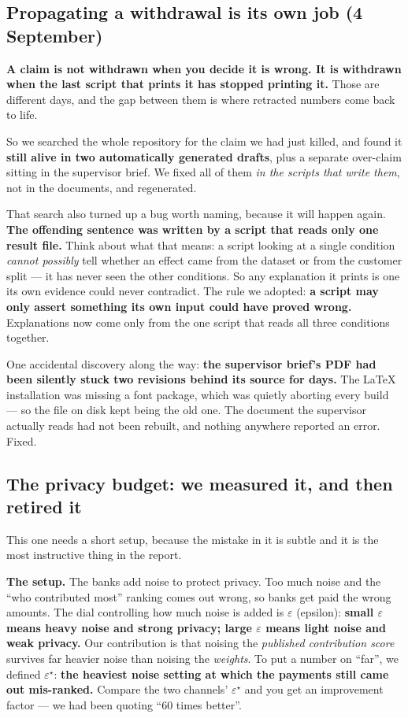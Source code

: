 \documentclass[11pt]{article}
\newcommand{\eps}{\ensuremath{\varepsilon}}
\newcommand{\epsst}{\ensuremath{\varepsilon^{\star}}}
\begin{document}
\subsection{Propagating a withdrawal is its own job (4 September)}

\textbf{A claim is not withdrawn when you decide it is wrong. It is withdrawn when the last script that
prints it has stopped printing it.} Those are different days, and the gap between them is where
retracted numbers come back to life.

So we searched the whole repository for the claim we had just killed, and found it \textbf{still alive
in two automatically generated drafts}, plus a separate over-claim sitting in the supervisor brief. We
fixed all of them \emph{in the scripts that write them}, not in the documents, and regenerated.

That search also turned up a bug worth naming, because it will happen again. \textbf{The offending
sentence was written by a script that reads only one result file.} Think about what that means: a script
looking at a single condition \emph{cannot possibly} tell whether an effect came from the dataset or
from the customer split --- it has never seen the other conditions. So any explanation it prints is one
its own evidence could never contradict. The rule we adopted: \textbf{a script may only assert something
its own input could have proved wrong.} Explanations now come only from the one script that reads all
three conditions together.

One accidental discovery along the way: \textbf{the supervisor brief's PDF had been silently stuck two
revisions behind its source for days.} The LaTeX installation was missing a font package, which was
quietly aborting every build --- so the file on disk kept being the old one. The document the supervisor
actually reads had not been rebuilt, and nothing anywhere reported an error. Fixed.

\subsection{The privacy budget: we measured it, and then retired it}
\label{sec:obj17}

This one needs a short setup, because the mistake in it is subtle and it is the most instructive thing
in the report.

\textbf{The setup.} The banks add noise to protect privacy. Too much noise and the ``who contributed
most'' ranking comes out wrong, so banks get paid the wrong amounts. The dial controlling how much noise
is added is \eps{} (epsilon): \textbf{small \eps{} means heavy noise and strong privacy; large \eps{}
means light noise and weak privacy.} Our contribution is that noising the \emph{published contribution
score} survives far heavier noise than noising the \emph{weights}. To put a number on ``far'', we
defined \epsst{}: \textbf{the heaviest noise setting at which the payments still came out mis-ranked.}
Compare the two channels' \epsst{} and you get an improvement factor --- we had been quoting ``60 times
better''.
\end{document}
